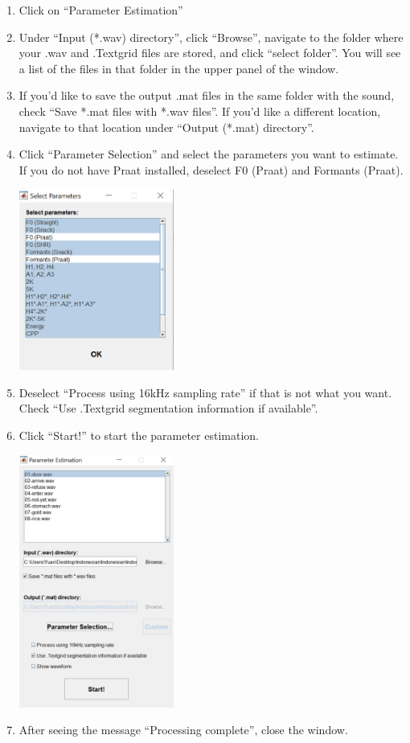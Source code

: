 \documentclass[
]{article}
\providecommand{\tightlist}{%
  \setlength{\itemsep}{0pt}\setlength{\parskip}{0pt}}
\begin{document}
\begin{enumerate}
\def\labelenumi{\arabic{enumi}.}
\tightlist
\item
  Click on ``Parameter Estimation''
\item
  Under ``Input (*.wav) directory'', click ``Browse'', navigate to the
  folder where your .wav and .Textgrid files are stored, and click
  ``select folder''. You will see a list of the files in that folder in
  the upper panel of the window.
\item
  If you'd like to save the output .mat files in the same folder with
  the sound, check ``Save *.mat files with *.wav files''. If you'd like
  a different location, navigate to that location under ``Output (*.mat)
  directory''.
\item
  Click ``Parameter Selection'' and select the parameters you want to
  estimate. If you do not have Praat installed, deselect F0 (Praat) and
  Formants (Praat).

  \includegraphics[width=0.4\textwidth,height=\textheight]{image/vs_parameter_selection.png}
\item
  Deselect ``Process using 16kHz sampling rate'' if that is not what you
  want. Check ``Use .Textgrid segmentation information if available''.
\item
  Click ``Start!'' to start the parameter estimation.

  \includegraphics[width=0.4\textwidth,height=\textheight]{image/vs_parameter_estimation.png}
\item
  After seeing the message ``Processing complete'', close the window.


\end{enumerate}
\end{document}

